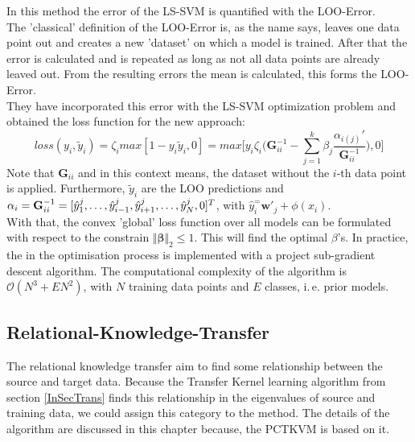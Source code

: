 In this method the error of the \acs{LS-SVM} is quantified with the \ac{LOO}-Error.\cite{Tommasi.}\\
The 'classical' definition of the \acs{LOO}-Error is, as the name says, leaves one data point out and creates a new 'dataset' on which a model is trained.
After that the error is calculated and is repeated as long as not all data points are already leaved out.
From the resulting errors the mean is calculated, this forms the \acl{LOO}-Error.\cite[p.74-76]{Evgeniou.2004}\\
They have incorporated this error with the \acs{LS-SVM} optimization problem and obtained the  loss function for the new approach:\cite{Tommasi.}
\begin{equation}
loss(y_i,\tilde{y}_i)= \zeta_i max[1-y_i\tilde{y}_i,0] = max \bigg[y_i\zeta_i\bigg({\mathbf{G}^{-1}_{ii}} - \sum_{j=1}^{k}\beta_j \frac{\alpha_{i(j)}'}{\mathbf{G}^{-1}_{ii}}\bigg),0\bigg]
\end{equation}
Note that $\mathbf{G}_{ii}$ and in this context means, the dataset without the $i$-th data point is applied.
Furthermore, $\tilde{y}_i$ are the \acs{LOO} predictions and $\alpha_i =\mathbf{G}_{ii}^{-1} = [\hat{y}_1^j,\dots,\hat{y}_{i-1}^j,\\\hat{y}_{i+1}^j,\dots,\hat{y}_N^j,0]^T$, with $\hat{y}_i^= \mathbf{w}'_j+\phi(x_i)$.\\
With that, the convex 'global' loss function over all models can be formulated with respect to the constrain $\Vert\boldsymbol{\beta}\Vert_2\le 1$.
This will find the optimal $\beta$'s.
In practice, the in the optimisation process is implemented with a project sub-gradient descent algorithm.\cite{Tommasi.}
The computational complexity of the algorithm is $\mathcal{O}(N^3+EN^2)$, with $N$ training data points and $E$ classes, i.\,e. prior models.
\subsection{Relational-Knowledge-Transfer}\label{TlSubSecRelation}
The relational knowledge transfer aim to find some relationship between the source and target data.\cite[p. 7]{Weiss.2016}
Because the Transfer Kernel learning algorithm from section \ref{InSecTrans} finds this relationship in the eigenvalues of source and training data, we could assign this category to the method.
The details of the algorithm are discussed in this chapter because, the \acl{PCTKVM} is based on it.


